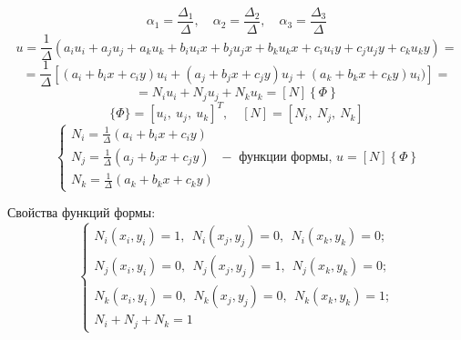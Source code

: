 	\[
	\alpha_1 = \frac{\Delta_1}{\Delta}, \quad \alpha_2 = \frac{\Delta_2}{\Delta}, \quad \alpha_3 = \frac{\Delta_3}{\Delta}
	\]
	\[
	u=\frac{1}{\Delta}(a_iu_i+a_ju_j+a_ku_k+b_iu_ix+b_ju_jx+b_ku_kx+c_iu_iy+c_ju_jy+c_ku_ky)=
	\]
	\[
	=\frac{1}{\Delta}\left[(a_i+b_ix+c_iy)u_i+(a_j+b_jx+c_jy)u_j+(a_k+b_kx+c_ky)u_i)\right]=
	\]
	\[
	=N_iu_i+N_ju_j+N_ku_k=\left[N\right]\left\{\Phi\right\}
	\]
	\[\{\Phi\} = [u_i, \ u_j,\ u_k]^T,\quad [N] = [N_i, \ N_j,\ N_k]\]
	\[
	\begin{cases}
		N_i = \frac{1}{\Delta}(a_i+b_ix+c_iy) \\
		N_j = \frac{1}{\Delta}(a_j+b_jx+c_jy) \\
		N_k = \frac{1}{\Delta}(a_k+b_kx+c_ky) 
	\end{cases} - \text{ функции формы, } u=\left[N\right]\left\{\Phi\right\}
	\]
	
	Свойства функций формы:
	\[\begin{cases}
	N_i(x_i, y_i) = 1,\ \ N_i(x_j, y_j) = 0,\ \ N_i(x_k, y_k) = 0;\\
	N_j(x_i, y_i) = 0,\ \ N_j(x_j, y_j) = 1,\ \ N_j(x_k, y_k) = 0;\\
	N_k(x_i, y_i) = 0,\ \ N_k(x_j, y_j) = 0,\ \ N_k(x_k, y_k) = 1;\\
	N_i + N_j + N_k = 1
	\end{cases}\]
	

